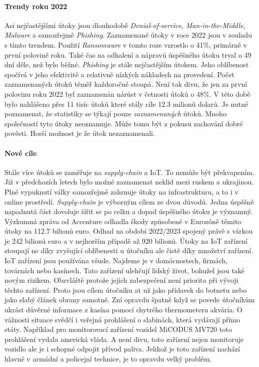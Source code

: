 \paragraph{Trendy roku 2022}
Asi nejčastějšími útoky jsou dlouhodobě \textit{Denial-of-service}, \textit{Man-in-the-Middle}, \textit{Malware} a samozřejmě \textit{Phishing}\cite{LI20218176}.
Zaznamenané útoky v roce 2022 jsou v souladu s tímto trendem.
Použití \textit{Ransomware} v tomto roze vzrostlo o 41\%, primárně v první polovině roku.
Také čas na odhalení a nápravů úspěšného útoku trval o 49 dní déle, než bylo běžné.
\textit{Phishing} je stále nejčastějším útokem.
Jeho oblíbenost spočívá v jeho efektivitě a relativně nízkých nákladech na provedení.
Počet zaznamenaných útoků téměř každoročně stoupá\cite{moje_bakalarka}.
Není tak divu, že jen za první polovinu roku 2022 byl zaznamenán nárůst v četnosti útoků o 48\%.
V této době bylo nahlášeno přes 11 tisíc útoků které stály cíle 12.3 milionů dolarů.
Je nutné poznamenat, že statistiky se týkají pouze \textit{zaznamenaných} útoků.
Mnoho společností tyto útoky neoznamuje.
Může tomu být z pokusu zachování dobré pověsti.
Horší možnost je že útok nezaznamenali.\cite{securityintelligence_most_common_2022_attacks}

\paragraph{Nové cíle}
Stále více útoků se zaměřuje na \textit{supply-chain} a \ac{IoT}.
To nemůže být překvapením.
Již v předchozích letech bylo možné zaznamenat neklid mezi ruskem a ukrajinou.
Plné vypuknutí války samozřejmě zahrnuje útoky na infrastrukturu, a to i v online prostředí.
\textit{Supply-chain} je výborným cílem ze dvou důvodů.
Jedna úspěšně napadnutá část dovoluje šířit se po celku a dopad úspěšného útoku je významný.
Výzkumná zpráva od Accenture\cite{accenture_supplu-chain-disruption} odhadla škody způsobené v Eurozóně těmito útoky na 112.7 bilionů euro.
Odhad na období 2022/2023 spojený právě s várkou je 242 bilionů euro a v nejhorším případě až 920 bilionů.
Útoky na \ac{IoT} zařízení stoupají ne díky zvyšující oblíbenesti u útočníku ale čistě díky množství zařízení.
\ac{IoT} zařízení jsou používána všude.
Najdeme je v domácnostech, firmách, továrnách nebo kasínech.
Tato zařízení ulehčují lidský život, bohužel jsou také novým rizikem.
Obzvláště protože jejich zabezpečení není priorita při vývoji těchto zařízení.
Proto jsou cílem útočníku at už jako přídavek do botnetu nebo jako slabý článek obrany samotné.
Zní opravdu špatně když se povede útočníkům ukrást důvěrné informace z kasína pomocí chytrého thermometeru akvária\cite{casino_thermometer}.
O vážnosti situace svědčí i veřejná prohlášení o slabinách, která vydávají přímo státy.
Například pro monitorovací zařízení vozidel MiCODUS MV720 toto prohlášení vydala americká vláda\cite{america_gov_advisories_micodus}.
A není divu, toto zařízení nejen monitoruje vozidlo ale je i schopné odpojit přívod paliva.
Jelikož je toto zařízení nachází hlavně v armádní a policejní technice, je to opravdu velký problém.\cite{securityintelligence_most_common_2022_attacks}

